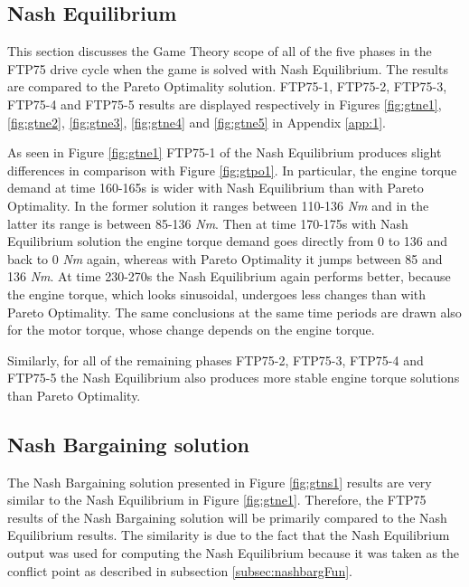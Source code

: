 \subsection{Nash Equilibrium}
This section discusses the Game Theory scope of all of the five phases in the FTP75 drive cycle when the game is solved with Nash Equilibrium. The results are compared to the Pareto Optimality solution. FTP75-1, FTP75-2, FTP75-3, FTP75-4 and FTP75-5 results are displayed respectively in Figures \ref{fig:gtne1}, \ref{fig:gtne2}, \ref{fig:gtne3}, \ref{fig:gtne4} and \ref{fig:gtne5} in Appendix \ref{app:1}.

As seen in Figure \ref{fig:gtne1} FTP75-1 of the Nash Equilibrium produces slight differences in comparison with Figure \ref{fig:gtpo1}. In particular, the engine torque demand at time 160-165s is wider with Nash Equilibrium than with Pareto Optimality. In the former solution it ranges between 110-136 \textit{Nm} and in the latter its range is between 85-136 \textit{Nm}. Then at time 170-175s with Nash Equilibrium solution the engine torque demand goes directly from 0 to 136 and back to 0 \textit{Nm} again, whereas with Pareto Optimality it jumps between 85 and 136 \textit{Nm}. At time 230-270s the Nash Equilibrium again performs better, because the engine torque, which looks sinusoidal, undergoes less changes than with Pareto Optimality. The same conclusions at the same time periods are drawn also for the motor torque, whose change depends on the engine torque.

Similarly, for all of the remaining phases FTP75-2, FTP75-3, FTP75-4 and FTP75-5 the Nash Equilibrium also produces more stable engine torque solutions than Pareto Optimality.

\subsection{Nash Bargaining solution}
The Nash Bargaining solution presented in Figure \ref{fig:gtns1} results are very similar to the Nash Equilibrium in Figure \ref{fig:gtne1}. Therefore, the FTP75 results of the Nash Bargaining solution will be primarily compared to the Nash Equilibrium results. The similarity is due to the fact that the Nash Equilibrium output was used for computing the Nash Equilibrium because it was taken as the conflict point as described in subsection \ref{subsec:nashbargFun}.

